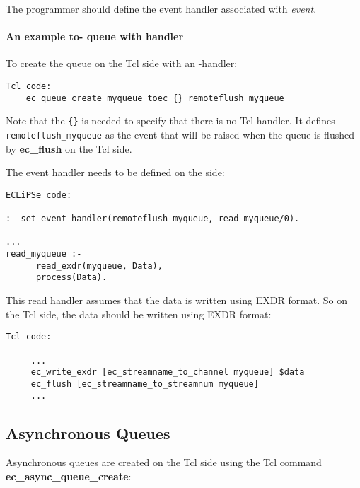 The programmer should define the event handler associated with {\it
event}.

\paragraph{An example to-{\eclipse} queue with {\eclipse} handler}

To create the queue on the Tcl side with an {\eclipse}-handler:

\begin{verbatim}
Tcl code: 
    ec_queue_create myqueue toec {} remoteflush_myqueue
\end{verbatim}

Note that the \verb'{}' is needed to specify that there is no Tcl handler. 
It defines \verb'remoteflush_myqueue' as the event that will be raised when
the queue is flushed by {\bf ec_flush} on the Tcl side. 

The event handler needs to be defined on the {\eclipse} side:

\begin{verbatim}
ECLiPSe code:

:- set_event_handler(remoteflush_myqueue, read_myqueue/0).

...
read_myqueue :-
      read_exdr(myqueue, Data),
      process(Data).

\end{verbatim}

This read handler assumes that the data is written using EXDR format. So on
the Tcl side, the data should be written using EXDR format:

\begin{verbatim}
Tcl code:

     ...
     ec_write_exdr [ec_streamname_to_channel myqueue] $data
     ec_flush [ec_streamname_to_streamnum myqueue]
     ...
\end{verbatim}


\subsection{Asynchronous Queues}

Asynchronous queues are created on the Tcl side using the Tcl command {\bf
ec_async_queue_create}:


